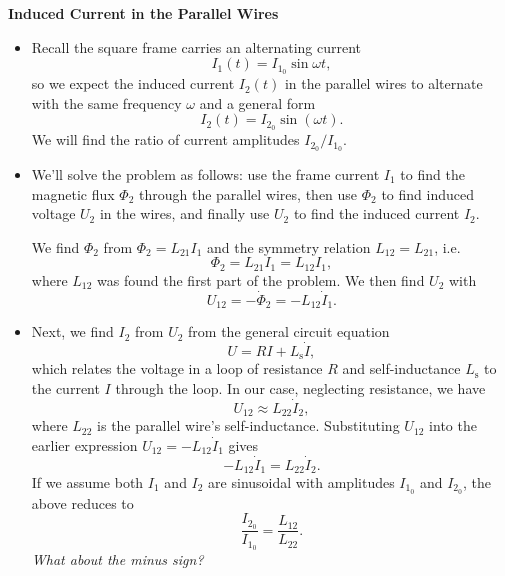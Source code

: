 \documentclass[11pt, a4paper]{article}
\begin{document}
\textbf{Induced Current in the Parallel Wires}
\begin{itemize}
	\item Recall the square frame carries an alternating current
	\begin{equation*}
		I_{1}(t) = I_{1_{0}}\sin \omega t,
	\end{equation*}
	so we expect the induced current $ I_{2}(t) $ in the parallel wires to alternate with the same frequency $ \omega $ and a general form
	\begin{equation*}
		I_{2}(t) = I_{2_{0}}\sin(\omega t).
	\end{equation*}
	We will find the ratio of current amplitudes $ I_{2_{0}} / I_{1_{0}} $.
	
	\item We'll solve the problem as follows: use the frame current $ I_{1} $ to find the magnetic flux $ \Phi_{2} $ through the parallel wires, then use $ \Phi_{2} $ to find induced voltage $ U_{2} $ in the wires, and finally use $ U_{2} $ to find the induced current $ I_{2} $.
	
	
	We find $ \Phi_{2} $ from $ \Phi_{2} = L_{21}I_{1} $ and the symmetry relation $ L_{12} = L_{21} $, i.e.
	\begin{equation*}
		\Phi_{2} = L_{21}I_{1} = L_{12} I_{1},
	\end{equation*}
	where $ L_{12} $ was found the first part of the problem. We then find $ U_{2} $ with
	\begin{equation*}
		U_{12} = - \dot{\Phi}_{2} = - L_{12}\dot{I}_{1}.
	\end{equation*}
	
	\item Next, we find $ I_{2} $ from $ U_{2} $ from the general circuit equation
	\begin{equation*}
		U = RI + L_{\text{s}}\dot{I},
	\end{equation*}
	which relates the voltage in a loop of resistance $ R $ and self-inductance $ L_{\text{s}} $ to the current $ I $ through the loop. In our case, neglecting resistance, we have
	\begin{equation*}
		U_{12} \approx L_{22} \dot{I}_{2},
	\end{equation*}
	where $ L_{22} $ is the parallel wire's self-inductance. Substituting $ U_{12} $ into the earlier expression $ U_{12} = -L_{12}\dot{I}_{1} $ gives
	\begin{equation*}
		-L_{12} \dot{I}_{1} = L_{22}\dot{I}_{2}.
	\end{equation*}
	If we assume both $ I_{1} $ and $ I_{2} $ are sinusoidal with amplitudes $ I_{1_{0}} $ and $ I_{2_{0}} $, the above reduces to
	\begin{equation*}
		\frac{I_{2_{0}}}{I_{1_{0}}} = \frac{L_{12}}{L_{22}}.
	\end{equation*}
	\textit{What about the minus sign?}
	

\end{itemize}
\end{document}
